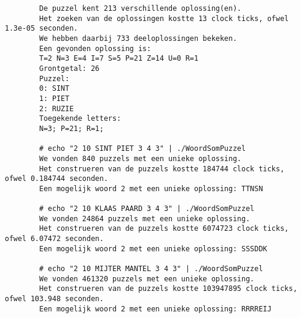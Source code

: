 \documentclass[10pt]{article}
\begin{document}
\begin{appendices}
\begin{lstlisting}
        De puzzel kent 213 verschillende oplossing(en).
        Het zoeken van de oplossingen kostte 13 clock ticks, ofwel 1.3e-05 seconden.
        We hebben daarbij 733 deeloplossingen bekeken.
        Een gevonden oplossing is:
        T=2 N=3 E=4 I=7 S=5 P=21 Z=14 U=0 R=1
        Grontgetal: 26 
        Puzzel:
        0: SINT
        1: PIET
        2: RUZIE
        Toegekende letters:
        N=3; P=21; R=1; 

        # echo "2 10 SINT PIET 3 4 3" | ./WoordSomPuzzel
        We vonden 840 puzzels met een unieke oplossing.
        Het construeren van de puzzels kostte 184744 clock ticks, ofwel 0.184744 seconden.
        Een mogelijk woord 2 met een unieke oplossing: TTNSN

        # echo "2 10 KLAAS PAARD 3 4 3" | ./WoordSomPuzzel
        We vonden 24864 puzzels met een unieke oplossing.
        Het construeren van de puzzels kostte 6074723 clock ticks, ofwel 6.07472 seconden.
        Een mogelijk woord 2 met een unieke oplossing: SSSDDK

        # echo "2 10 MIJTER MANTEL 3 4 3" | ./WoordSomPuzzel 
        We vonden 461320 puzzels met een unieke oplossing.
        Het construeren van de puzzels kostte 103947895 clock ticks, ofwel 103.948 seconden.
        Een mogelijk woord 2 met een unieke oplossing: RRRREIJ

        
    \end{lstlisting}
 

\end{appendices}
\end{document}
